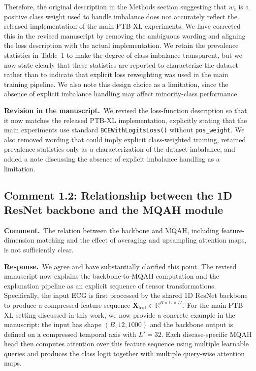 \documentclass[11pt]{article}
\newcommand{\commentheader}{\textbf{Comment.}}
\newcommand{\responseheader}{\textbf{Response.}}
\newcommand{\revisionheader}{\textbf{Revision in the manuscript.}}
\begin{document}
Therefore, the original description in the Methods section suggesting that $w_c$ is a positive class weight used to handle imbalance does not accurately reflect the released implementation of the main PTB-XL experiments. We have corrected this in the revised manuscript by removing the ambiguous wording and aligning the loss description with the actual implementation. We retain the prevalence statistics in Table~1 to make the degree of class imbalance transparent, but we now state clearly that these statistics are reported to characterize the dataset rather than to indicate that explicit loss reweighting was used in the main training pipeline. We also note this design choice as a limitation, since the absence of explicit imbalance handling may affect minority-class performance.

\revisionheader\ We revised the loss-function description so that it now matches the released PTB-XL implementation, explicitly stating that the main experiments use standard \texttt{BCEWithLogitsLoss()} without \texttt{pos\_weight}. We also removed wording that could imply explicit class-weighted training, retained prevalence statistics only as a characterization of the dataset imbalance, and added a note discussing the absence of explicit imbalance handling as a limitation.

\subsection*{Comment 1.2: Relationship between the 1D ResNet backbone and the MQAH module}

\commentheader\ The relation between the backbone and MQAH, including feature-dimension matching and the effect of averaging and upsampling attention maps, is not sufficiently clear.

\responseheader\ We agree and have substantially clarified this point. The revised manuscript now explains the backbone-to-MQAH computation and the explanation pipeline as an explicit sequence of tensor transformations. Specifically, the input ECG is first processed by the shared 1D ResNet backbone to produce a compressed feature sequence $\mathbf{X}_{\mathrm{feat}} \in \mathbb{R}^{B \times C \times L'}$. For the main PTB-XL setting discussed in this work, we now provide a concrete example in the manuscript: the input has shape $(B,12,1000)$ and the backbone output is defined on a compressed temporal axis with $L'=32$. Each disease-specific MQAH head then computes attention over this feature sequence using multiple learnable queries and produces the class logit together with multiple query-wise attention maps.
\end{document}
